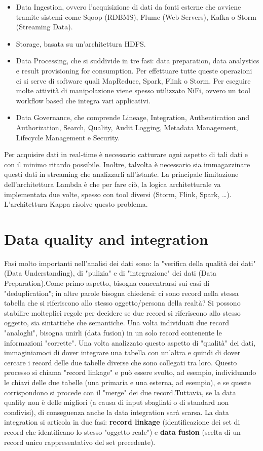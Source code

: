 \documentclass[a4page, 11pt]{article}
\begin{document}
\begin{itemize}[noitemsep]
\item Data Ingestion, ovvero l’acquisizione di dati da fonti esterne che avviene tramite sistemi come Sqoop (RDBMS), Flume (Web Servers), Kafka o Storm (Streaming Data).
\item Storage, basata su un’architettura HDFS.
\item Data Processing, che si suddivide in tre fasi: data preparation, data analystics e result provisioning for consumption. Per effettuare tutte queste operazioni ci si serve di software quali MapReduce, Spark, Flink o Storm. Per eseguire molte attività di manipolazione viene spesso utilizzato NiFi, ovvero un tool workflow based che integra vari applicativi.
\item Data Governance, che comprende Lineage, Integration, Authentication and Authorization, Search, Quality, Audit Logging, Metadata Management, Lifecycle Management e Security.
\end{itemize}
Per acquisire dati in real-time è necessario catturare ogni aspetto di tali dati e con il minimo ritardo possibile. Inoltre, talvolta è necessario sia immagazzinare questi dati in streaming che analizzarli all’istante. La principale limitazione dell’architettura Lambda è che per fare ciò, la logica architetturale va implementata due volte, spesso con tool diversi (Storm, Flink, Spark, …). L’architettura Kappa risolve questo problema.
\section{Data quality and integration}
Fasi molto importanti nell'analisi dei dati sono: la "verifica della qualità dei dati" (Data Understanding), di "pulizia" e di "integrazione" dei dati (Data Preparation).\newline Come primo aspetto, bisogna concentrarsi sui casi di "deduplication"; in altre parole bisogna chiedersi: ci sono record nella stessa tabella che si riferiscono allo stesso oggetto/persona della realtà? Si possono stabilire molteplici regole per decidere se due record si riferiscono allo stesso oggetto, sia sintattiche che semantiche. Una volta individuati due record "analoghi", bisogna unirli (data fusion) in un solo record contenente le informazioni "corrette". Una volta analizzato questo aspetto di "qualità" dei dati, immaginiamoci di dover integrare una tabella con un’altra e quindi di dover cercare i record delle due tabelle diverse che sono collegati tra loro. Questo processo si chiama "record linkage" e può essere svolto, ad esempio, individuando le chiavi delle due tabelle (una primaria e una esterna, ad esempio), e se queste corrispondono si procede con il "merge" dei due record.\newline Tuttavia, se la data quality non è delle migliori (a causa di input sbagliati o di standard non condivisi), di conseguenza anche la data integration sarà scarsa.\newline
La data integration si articola in due fasi: \textbf{record linkage} (identificazione dei set di record che identificano lo stesso "oggetto reale") e \textbf{data fusion} (scelta di un record unico rappresentativo del set precedente).
\end{document}
